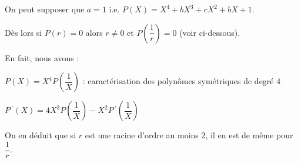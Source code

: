 On peut supposer que $a = 1$ i.e. $P(X) = X^4 + b X^3 + c X^2 + b X + 1$.

Dès lors si $P(r) = 0$ alors $r \neq 0$ et $P\left( \dfrac1r \right) = 0$ (voir ci-dessous).

En fait, nous avons :

\medskip

$P(X) = X^4 P\left( \dfrac1X \right)$ : caractérisation des polynômes symétriques de degré $4$

\medskip

$P\,^{\prime}(X) = 4 X^3 P\left( \dfrac1X \right) 
            - X^2 P\,^{\prime}\left( \dfrac1X \right)$

%
%

On en déduit que si $r$ est une racine d'ordre au moins $2$, il en est de même pour $\dfrac1r$.
